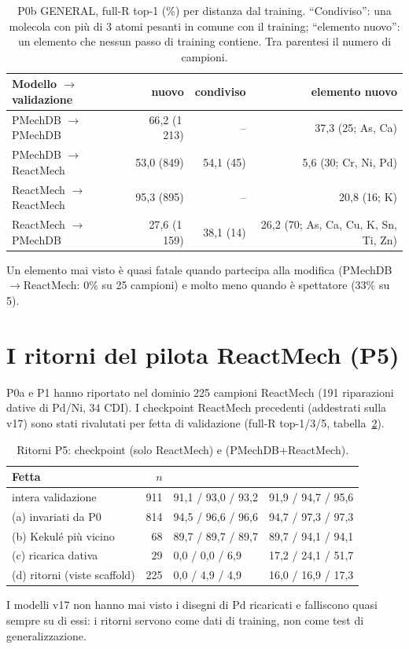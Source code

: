 \documentclass[11pt,a4paper]{report}
\newcommand{\code}[1]{\texttt{\detokenize{#1}}}
\begin{document}
\begin{table}[H]
\centering
\caption{P0b GENERAL, full-R top-1 (\%) per distanza dal training. \enquote{Condiviso}: una molecola
con più di 3 atomi pesanti in comune con il training; \enquote{elemento nuovo}: un elemento che nessun
passo di training contiene. Tra parentesi il numero di campioni.}
\label{tab:distanza}
\small
\begin{tabular}{@{}lrrr@{}}
\toprule
Modello $\to$ validazione & nuovo & condiviso & elemento nuovo\\
\midrule
PMechDB $\to$ PMechDB & 66{,}2 (1\,213) & -- & 37{,}3 (25; As, Ca)\\
PMechDB $\to$ ReactMech & 53{,}0 (849) & 54{,}1 (45) & 5{,}6 (30; Cr, Ni, Pd)\\
ReactMech $\to$ ReactMech & 95{,}3 (895) & -- & 20{,}8 (16; K)\\
ReactMech $\to$ PMechDB & 27{,}6 (1\,159) & 38{,}1 (14) & 26{,}2 (70; As, Ca, Cu, K, Sn, Ti, Zn)\\
\bottomrule
\end{tabular}
\end{table}
Un elemento mai visto è quasi fatale quando partecipa alla modifica (PMechDB$\to$ReactMech: 0\% su 25
campioni) e molto meno quando è spettatore (33\% su 5).

\section{I ritorni del pilota ReactMech (P5)}
P0a e P1 hanno riportato nel dominio 225 campioni ReactMech (191 riparazioni dative di Pd/Ni, 34 CDI).
I checkpoint ReactMech precedenti (addestrati sulla v17) sono stati rivalutati per fetta di validazione
(full-R top-1/3/5, tabella~\ref{tab:p5}).

\begin{table}[H]
\centering
\caption{Ritorni P5: checkpoint \code{stop0} (solo ReactMech) e \code{joint} (PMechDB+ReactMech).}
\label{tab:p5}
\small
\begin{tabular}{@{}lrll@{}}
\toprule
Fetta & $n$ & \code{stop0} & \code{joint}\\
\midrule
intera validazione & 911 & 91{,}1 / 93{,}0 / 93{,}2 & 91{,}9 / 94{,}7 / 95{,}6\\
(a) invariati da P0 & 814 & 94{,}5 / 96{,}6 / 96{,}6 & 94{,}7 / 97{,}3 / 97{,}3\\
(b) Kekulé più vicino & 68 & 89{,}7 / 89{,}7 / 89{,}7 & 89{,}7 / 94{,}1 / 94{,}1\\
(c) ricarica dativa & 29 & 0{,}0 / 0{,}0 / 6{,}9 & 17{,}2 / 24{,}1 / 51{,}7\\
(d) ritorni (viste scaffold) & 225 & 0{,}0 / 4{,}9 / 4{,}9 & 16{,}0 / 16{,}9 / 17{,}3\\
\bottomrule
\end{tabular}
\end{table}
I modelli v17 non hanno mai visto i disegni di Pd ricaricati e falliscono quasi sempre su di essi: i
ritorni servono come dati di training, non come test di generalizzazione.
\end{document}
